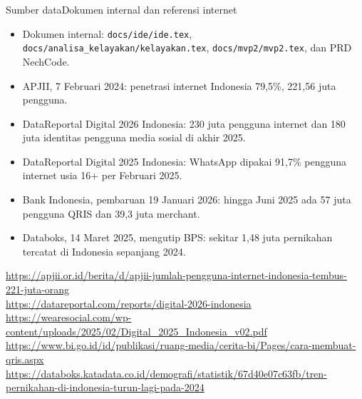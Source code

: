 \documentclass[aspectratio=169,11pt]{beamer}
\begin{document}
\begin{frame}[shrink=12]{Sumber data}{Dokumen internal dan referensi internet}
\small
\begin{itemize}
  \item Dokumen internal: \texttt{docs/ide/ide.tex}, \texttt{docs/analisa\_kelayakan/kelayakan.tex}, \texttt{docs/mvp2/mvp2.tex}, dan PRD NechCode.
  \item APJII, 7 Februari 2024: penetrasi internet Indonesia 79,5\%, 221,56 juta pengguna.
  \item DataReportal Digital 2026 Indonesia: 230 juta pengguna internet dan 180 juta identitas pengguna media sosial di akhir 2025.
  \item DataReportal Digital 2025 Indonesia: WhatsApp dipakai 91,7\% pengguna internet usia 16+ per Februari 2025.
  \item Bank Indonesia, pembaruan 19 Januari 2026: hingga Juni 2025 ada 57 juta pengguna QRIS dan 39,3 juta merchant.
  \item Databoks, 14 Maret 2025, mengutip BPS: sekitar 1,48 juta pernikahan tercatat di Indonesia sepanjang 2024.
\end{itemize}

\vspace{0.10cm}
{\scriptsize\color{TextMuted}
\url{https://apjii.or.id/berita/d/apjii-jumlah-pengguna-internet-indonesia-tembus-221-juta-orang}\\
\url{https://datareportal.com/reports/digital-2026-indonesia}\\
\url{https://wearesocial.com/wp-content/uploads/2025/02/Digital_2025_Indonesia_v02.pdf}\\
\url{https://www.bi.go.id/id/publikasi/ruang-media/cerita-bi/Pages/cara-membuat-qris.aspx}\\
\url{https://databoks.katadata.co.id/demografi/statistik/67d40e07c63fb/tren-pernikahan-di-indonesia-turun-lagi-pada-2024}
}
\end{frame}
\end{document}
